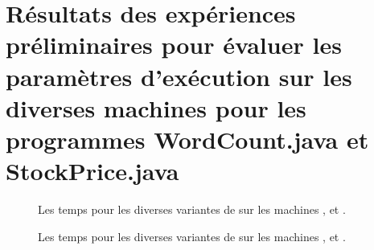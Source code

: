 
\chapter[Résultats des expériences préliminaires pour les programmes {WordCount.java} et {StockPrice.java}]{Résultats des expériences préliminaires pour évaluer les paramètres
d'exécution sur les diverses machines pour les programmes
{WordCount.java} et {StockPrice.java}}


\label{wordcount-java.ann}


\begin{figure}

\caption{Les temps pour les diverses variantes de  sur
les machines ,  et .}
\label{preliminaires-wordcount-java.fig}
\end{figure}



\newpage

\label{stockprice-java.ann}


\begin{figure}

\caption{Les temps pour les diverses variantes de  sur
les machines ,  et .}
\label{preliminaires-stockprice-java.fig}
\end{figure}

